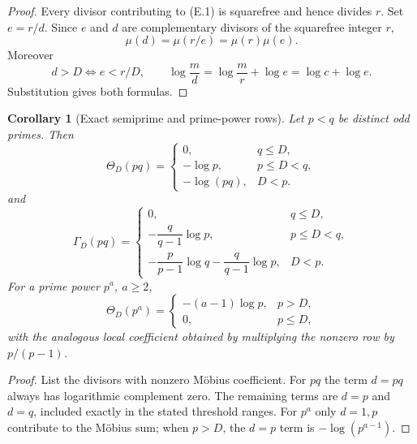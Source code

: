 \documentclass[11pt]{article}
\newtheorem{corollary}[theorem]{Corollary}
\theoremstyle{definition}
\theoremstyle{remark}
\begin{document}
\begin{proof}
Every divisor contributing to \textup{(E.1)} is squarefree and hence divides
$r$.  Set $e=r/d$.  Since $e$ and $d$ are complementary divisors of the
squarefree integer $r$,
\[
 \mu(d)=\mu(r/e)=\mu(r)\mu(e).
\]
Moreover
\[
 d>D\iff e<r/D,
 \qquad
 \log\frac md=\log\frac mr+\log e=\log c+\log e.
\]
Substitution gives both formulas.
\end{proof}

\begin{corollary}[Exact semiprime and prime-power rows]
\label{cor:affend-shallow-rows}
Let $p<q$ be distinct odd primes.  Then
\begin{equation}
 \label{eq:affend-semiprime-theta}
 \boxed{
 \Theta_D(pq)=
 \begin{cases}
  0,&q\le D,\\
  -\log p,&p\le D<q,\\
  -\log(pq),&D<p.
 \end{cases}}
 \tag{E.11}
\end{equation}
and
\begin{equation}
 \label{eq:affend-semiprime-gamma}
 \boxed{
 \Gamma_D(pq)=
 \begin{cases}
  0,&q\le D,\\
  -\dfrac{q}{q-1}\log p,&p\le D<q,\\[0.8em]
  -\dfrac{p}{p-1}\log q
  -\dfrac{q}{q-1}\log p,&D<p.
 \end{cases}}
 \tag{E.12}
\end{equation}
For a prime power $p^a$, $a\ge2$,
\begin{equation}
 \label{eq:affend-prime-power-row}
 \boxed{
 \Theta_D(p^a)=
 \begin{cases}
  -(a-1)\log p,&p>D,\\
  0,&p\le D,
 \end{cases}}
 \tag{E.13}
\end{equation}
with the analogous local coefficient obtained by multiplying the nonzero row
by $p/(p-1)$.
\end{corollary}

\begin{proof}
List the divisors with nonzero M\"obius coefficient.  For $pq$ the term
$d=pq$ always has logarithmic complement zero.  The remaining terms are
$d=p$ and $d=q$, included exactly in the stated threshold ranges.  For $p^a$
only $d=1,p$ contribute to the M\"obius sum; when $p>D$, the $d=p$ term is
$-\log(p^{a-1})$.
\end{proof}
\end{document}

